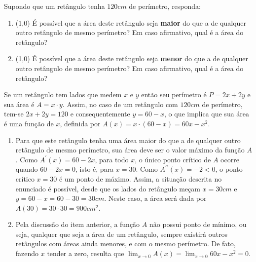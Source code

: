 \documentclass[12pt,a4paper]{article}
\begin{document}
\begin{ExerciseList}
\Exercise[title={2,0}] Supondo que um retângulo tenha $120cm$ de perímetro, responda:
\begin{enumerate}
\item (1,0) É possível que a área deste retângulo seja \textbf{maior} do que a de qualquer outro retângulo de mesmo perímetro? Em caso afirmativo, qual é a área do retângulo?
\item (1,0) É possível que a área deste retângulo seja \textbf{menor} do que a de qualquer outro retângulo de mesmo perímetro? Em caso afirmativo, qual é a área do retângulo?
\end{enumerate}
\Answer Se um retângulo tem lados que medem $x$ e $y$ então seu perímetro é $P = 2x+2y$ e sua área é $A = x \cdot y$. Assim, no caso de um retângulo com $120cm$ de perímetro, tem-se $2x+2y = 120$ e consequentemente $y=60-x$, o que implica que sua área é uma função de $x$, definida por $A(x) = x \cdot( 60 - x ) = 60x - x^2$.
\begin{enumerate}
\item Para que este retângulo tenha uma área maior do que a de qualquer outro retângulo de mesmo perímetro, sua área deve ser o valor máximo da função $A$. Como $A^\prime(x) = 60-2x$, para todo $x$, o único ponto crítico de $A$ ocorre quando $60-2x = 0$, isto é, para $x = 30$. Como $A^{\prime\prime}(x) = -2 < 0$, o ponto crítico $x = 30$ é um ponto de máximo. Assim, a situação descrita no enunciado é possível, desde que os lados do retângulo meçam $x = 30cm$ e $y = 60 - x = 60 - 30 = 30 cm$. Neste caso, a área será dada por $A(30) = 30 \cdot 30  = 900 cm^2$.
\item Pela discussão do item anterior, a função $A$ não possui ponto de mínimo, ou seja, qualquer que seja a área de um retângulo, sempre existirá outros retângulos com áreas ainda menores, e com o mesmo perímetro. De fato, fazendo $x$ tender a zero, resulta que $\lim_{x \to 0} A(x) = \lim_{x \to 0} 60x-x^2 = 0$.
\end{enumerate}


\end{ExerciseList}
\end{document}
